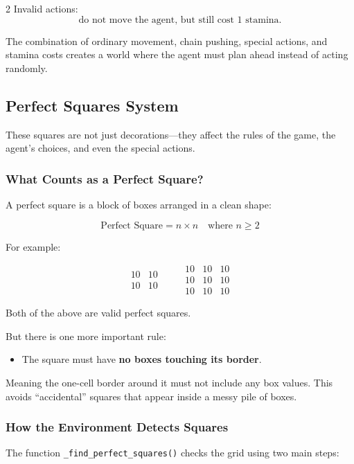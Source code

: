 \documentclass[a4paper]{article}
\begin{document}
\begin{multicols}{2}
Invalid actions:
\[
\text{do not move the agent, but still cost } 1 \text{ stamina}.
\]

The combination of ordinary movement, chain pushing, special actions, and stamina costs creates a world where the agent must plan ahead instead of acting randomly. 


\subsection{Perfect Squares System}

These squares are not just decorations—they affect the rules of the game, the agent’s choices, and even the special actions. 

\subsubsection{What Counts as a Perfect Square?}

A perfect square is a block of boxes arranged in a clean shape:

\[
\text{Perfect Square} = n \times n \quad \text{where } n \ge 2
\]

For example:

\[
\begin{matrix}
10 & 10 \\
10 & 10
\end{matrix}
\qquad
\begin{matrix}
10 & 10 & 10 \\
10 & 10 & 10 \\
10 & 10 & 10
\end{matrix}
\]

Both of the above are valid perfect squares.

But there is one more important rule:

\begin{itemize}
    \item The square must have \textbf{no boxes touching its border}.
\end{itemize}

Meaning the one-cell border around it must not include any box values. This avoids “accidental” squares that appear inside a messy pile of boxes.

\subsubsection{How the Environment Detects Squares}

The function \texttt{\_find\_perfect\_squares()} checks the grid using two main steps:


\end{multicols}
\end{document}
